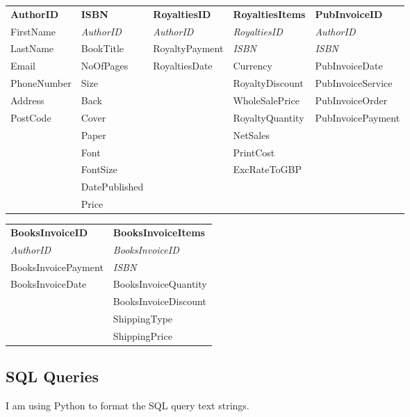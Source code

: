 \begin{tabular}{|p{2.5cm}|p{2.5cm}|p{2.5cm}|p{3cm}|p{3cm}|}
    \hline
    \textbf{AuthorID} & \textbf{ISBN} & \textbf{RoyaltiesID} & \textbf{RoyaltiesItems} & \textbf{PubInvoiceID} \\
    FirstName & \emph{AuthorID} & \emph{AuthorID} & \emph{RoyaltiesID} & \emph{AuthorID} \\
    LastName & BookTitle & RoyaltyPayment & \emph{ISBN} & \emph{ISBN} \\
    Email & NoOfPages & RoyaltiesDate & Currency & PubInvoiceDate \\
    PhoneNumber & Size & & RoyaltyDiscount & PubInvoiceService \\
    Address & Back & & WholeSalePrice & PubInvoiceOrder \\
    PostCode & Cover & & RoyaltyQuantity & PubInvoicePayment \\
    & Paper & & NetSales & \\
    & Font & & PrintCost & \\
    & FontSize & & ExcRateToGBP & \\
    & DatePublished & & & \\
    & Price & & & \\
    \hline
\end{tabular}

\begin{tabular}{|p{3.5cm}|p{3.5cm}|}
    \hline
    \textbf{BooksInvoiceID} & \textbf{BooksInvoiceItems} \\
    \emph{AuthorID} & \emph{BooksInvoiceID} \\
    BooksInvoicePayment & \emph{ISBN} \\
    BooksInvoiceDate & BooksInvoiceQuantity \\
    & BooksInvoiceDiscount \\
    & ShippingType \\
    & ShippingPrice \\
    \hline
\end{tabular}

\newpage

\subsection{SQL Queries}

I am using Python to format the SQL query text strings.


